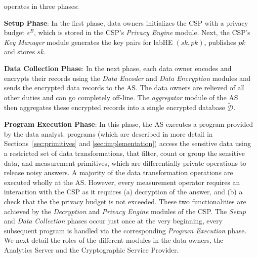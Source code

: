 \system operates in three phases: 
 \squishlist
 \item \textbf{Setup Phase}: In the first phase, data owners initializes the \textsf{CSP} with a privacy budget $\epsilon^B$, which is stored in the \textsf{CSP}'s \textit{Privacy Engine} module. Next, the  \textsf{CSP}'s \textit{Key Manager} module generates the key pairs for labHE $(sk,pk)$, publishes $pk$ and stores $sk$. 
 \item \textbf{Data Collection Phase}: In the next phase, each data owner encodes and encrypts their records using the \textit{Data Encoder} and \textit{Data Encryption} modules and sends the encrypted data records to the \textsf{AS}. The data owners are relieved of all other duties and can go completely off-line. The \textit{aggregator} module of the \textsf{AS} then aggregates these encrypted records into a single encrypted database $\boldsymbol{\tilde{\mathcal{D}}}$.
 \item \textbf{Program Execution Phase}: In this phase, the \textsf{AS} executes a \system program provided by the data analyst. \system programs (which are described in more detail in Sections~\ref{sec:primitives} and \ref{sec:implementation}) access the sensitive data using a restricted set of data transformations, that filter, count or group the sensitive data, and measurement primitives, which are differentially private operations to release noisy answers. A majority of the data transformation operations are executed wholly at the \textsf{AS}. However, every measurement operator requires an interaction with the \textsf{CSP} as it requires (a) decryption of the answer, and (b) a check that the the privacy budget is not exceeded. These two functionalities are achieved by the \textit{Decryption} and \textit{Privacy Engine} modules of the \textsf{CSP}.
 \squishend
 The \emph{Setup} and \emph{Data Collection} phases occur just once at the very beginning, every subsequent program  is handled via the corresponding  \emph{Program Execution} phase. We next detail the roles of the different modules in the data owners, the Analytics Server and the Cryptographic Service Provider.  


